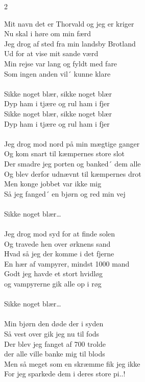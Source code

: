 \documentclass[a4paper,12pt]{memoir}
\begin{document}
\begin{multicols}{2}
\raggedcolumns

\noindent Mit navn det er Thorvald og jeg er kriger\\
Nu skal i høre om min færd\\
Jeg drog af sted fra min landsby Brotland\\
Ud for at vise mit sande værd\\
Min rejse var lang og fyldt med fare\\
Som ingen anden vil´ kunne klare\\
\\
Sikke noget blær, sikke noget blær\\
Dyp ham i tjære og rul ham i fjer\\
Sikke noget blær, sikke noget blær\\
Dyp ham i tjære og rul ham i fjer\\
\\
Jeg drog mod nord på min mægtige ganger\\
Og kom snart til kæmpernes store slot\\
Der smadre jeg porten og banked´ dem alle\\
Og blev derfor udnævnt til kæmpernes drot\\
Men konge jobbet var ikke mig\\
Så jeg fanged´ en bjørn og red min vej\\
\\
Sikke noget blær…\\
\\
Jeg drog mod syd for at finde solen\\
Og travede hen over ørknens sand\\
Hvad så jeg der komme i det fjerne\\
En hær af vampyrer, mindst 1000 mand\\
Godt jeg havde et stort hvidløg\\
og vampyrerne gik alle op i røg\\
\\
Sikke noget blær…\\
\\
Min bjørn den døde der i syden\\
Så vest over gik jeg nu til fods\\
Der blev jeg fanget af 700 trolde\\
der alle ville banke mig til blods\\
Men så meget som en skræmme fik jeg ikke\\
For jeg sparkede dem i deres store pi..!\\

\end{multicols}
\end{document}
